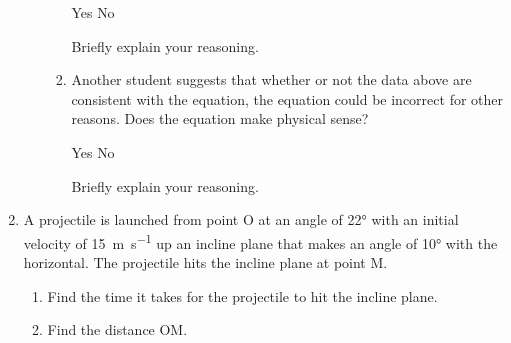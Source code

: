 \documentclass{../../../oss-apphys}
\begin{document}
\begin{enumerate}[leftmargin=15pt]
\begin{enumerate}[noitemsep,topsep=0pt]
\begin{enumerate}[noitemsep,topsep=0pt]
      \vspace{.1in}
      \underline{\hspace{.25in}} Yes\hspace{.5in}
      \underline{\hspace{.25in}} No

      \vspace{.1in}Briefly explain your reasoning.\vspace{.4in}
    \item Another student suggests that whether or not the data above are
      consistent with the equation, the equation could be incorrect for other
      reasons. Does the equation make physical sense?

      \vspace{.1in}
      \underline{\hspace{.25in}} Yes\hspace{.5in}
      \underline{\hspace{.25in}} No
    
      \vspace{.1in}Briefly explain your reasoning.\vspace{1in}
    \end{enumerate}
  \end{enumerate}
  \newpage
  
\item A projectile is launched from point O at an angle of \ang{22} with an
  initial velocity of \SI{15}{\metre\per\second} up an incline plane that makes
  an angle of \ang{10} with the horizontal. The projectile hits the incline
  plane at point M.
  \begin{center}
  \end{center}
  \begin{enumerate}[noitemsep,topsep=0pt]
  \item Find the time it takes for the projectile to hit the incline plane.
  \item Find the distance OM.
  \end{enumerate}
  


\end{enumerate}
\end{document}
